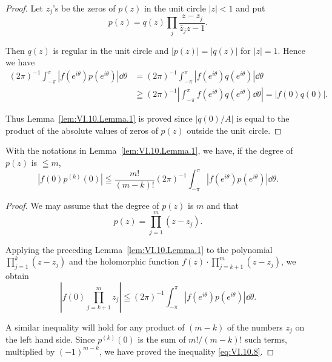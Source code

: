 \begin{proof}
 Let $z_{j}$'s be the zeros of $p(z)$ in the unit circle $|z| < 1$ and put 
\[
p (z) = q (z) \prod\limits_{j} \frac {z - z _{j}}{\bar {z} _{j} z - 1}. \]

Then $q(z)$ is regular in the unit circle and $|p(z)| = |q(z)|$ for $|z| = 1$. Hence we have 
\[
\begin{aligned} (2 \pi) ^{-1} \int_{- \pi} ^{\pi} | f (e ^{i \theta}) p (e ^{i \theta}) | \dd \theta & = (2 \pi) ^{-1} \int_{- \pi} ^{\pi} | f (e ^{i \theta}) q (e ^{i \theta}) | \dd \theta \\ & \geqq (2 \pi) ^{-1} \left| \int_{- \pi} ^{\pi} f (e ^{i \theta}) q (e ^{i \theta}) \dd \theta \right| = | f (0) q (0) |. \end{aligned}
\]

Thus Lemma~\ref{lem:VI.10.Lemma.1} is proved since $|q(0)/A|$ is equal to the product of the absolute values of zeros of $p(z)$ outside the unit circle. 
\end{proof}

\begin{lemma}\label{lem:VI.10.Lemma.2} With the notations in Lemma~\ref{lem:VI.10.Lemma.1}, we have, if the degree of $p(z)$ is $\leqq m$, 
\begin{equation}\label{eq:VI.10.8}
\left| f (0) p ^{(k)} (0) \right| \leqq \frac {m !}{(m - k) !} (2 \pi) ^{-1} \int_{- \pi} ^{\pi} \left| f \left(e ^{i \theta}\right) p \left(e ^{i \theta}\right) \right| \dd \theta .
\end{equation}
\end{lemma}

\begin{proof}
 We may assume that the degree of $p(z)$ is $m$ and that 
\[
p (z) = \prod\limits_{j=1} ^{m} (z - z _{j}). \]

Applying the preceding Lemma~\ref{lem:VI.10.Lemma.1} to the polynomial $\prod\limits_{j=1}^{k}(z-z_j)$ and the holomorphic function $f(z) \cdot \prod\limits_{j=k+1}^{m}(z-z_j)$, we obtain 
\[
\left| f (0) \prod\limits_{j=k+1} ^{m} z _{j} \right| \leqq (2 \pi) ^{-1} \int_{- \pi} ^{\pi} | f (e ^{i \theta}) p (e ^{i \theta}) | \dd \theta .
\]

A similar inequality will hold for any product of $(m - k)$ of the numbers $z_{j}$ on the left hand side. Since $p^{(k)}(0)$ is the sum of $m!/(m-k)!$ such terms, multiplied by $(-1)^{m-k}$, we have proved the inequality \eqref{eq:VI.10.8}. 
\end{proof}

